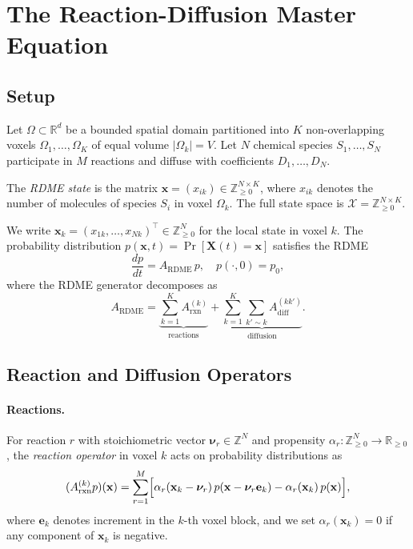 \documentclass[review,onefignum,onetabnum]{siamart171218}
\newcommand{\bx}{\mathbf{x}}
\newcommand{\bnu}{\boldsymbol{\nu}}
\newcommand{\R}{\mathbb{R}}
\newcommand{\Z}{\mathbb{Z}}
\newcommand{\Znn}{\mathbb{Z}_{\geq 0}}
\newcommand{\calX}{\mathcal{X}}
\begin{document}
\section{The Reaction-Diffusion Master Equation}
\label{sec:rdme}

\subsection{Setup}
\label{sec:setup}

Let $\Omega \subset \R^d$ be a bounded spatial domain partitioned
into $K$ non-overlapping voxels $\Omega_1,\ldots,\Omega_K$ of
equal volume $|\Omega_k| = V$.  Let $N$ chemical species
$S_1,\ldots,S_N$ participate in $M$ reactions and diffuse with
coefficients $D_1,\ldots,D_N$.

\begin{definition}
  The \emph{RDME state} is the matrix
  $\bx = (x_{ik}) \in \Znn^{N \times K}$, where $x_{ik}$ denotes
  the number of molecules of species $S_i$ in voxel $\Omega_k$.
  The full state space is $\calX = \Znn^{N \times K}$.
\end{definition}

We write $\bx_k = (x_{1k},\ldots,x_{Nk})^\top \in \Znn^N$ for
the local state in voxel $k$.  The probability distribution
$p(\bx, t) = \Pr[\mathbf{X}(t) = \bx]$ satisfies the RDME
\begin{equation}
  \label{eq:rdme}
  \frac{dp}{dt} = A_{\mathrm{RDME}}\, p,
  \quad p(\cdot,0) = p_0,
\end{equation}
where the RDME generator decomposes as
\begin{equation}
  \label{eq:gen-split}
  A_{\mathrm{RDME}} = \underbrace{\sum_{k=1}^{K} A_{\mathrm{rxn}}^{(k)}}_{\text{reactions}}
    + \underbrace{\sum_{k=1}^{K}\sum_{k' \sim k} A_{\mathrm{diff}}^{(kk')}}_{\text{diffusion}}.
\end{equation}

\subsection{Reaction and Diffusion Operators}

\paragraph{Reactions.}
For reaction $r$ with stoichiometric vector $\bnu_r \in \Z^N$
and propensity $\alpha_r : \Znn^N \to \R_{\geq 0}$, the
\emph{reaction operator} in voxel $k$ acts on probability
distributions as
\begin{equation}
  \label{eq:rxn-op}
  (A_{\mathrm{rxn}}^{(k)} p)(\bx)
  = \sum_{r=1}^{M}
    \Bigl[
      \alpha_r(\bx_k - \bnu_r)\, p(\bx - \bnu_r \mathbf{e}_k)
      - \alpha_r(\bx_k)\, p(\bx)
    \Bigr],
\end{equation}
where $\mathbf{e}_k$ denotes increment in the $k$-th voxel block,
and we set $\alpha_r(\bx_k) = 0$ if any component of $\bx_k$ is
negative.
\end{document}
